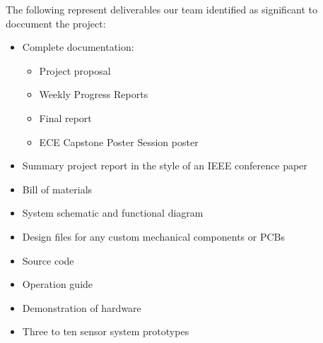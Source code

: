 The following represent deliverables our team identified as significant to doccument the project:
\begin{itemize}
\item Complete documentation:
\begin{itemize}
\item Project proposal
\item Weekly Progress Reports
\item Final report
\item ECE Capstone Poster Session poster
\end{itemize}
\item Summary project report in the style of an IEEE conference paper
\item Bill of materials
\item System schematic and functional diagram
\item Design files for any custom mechanical components or PCBs
\item Source code
\item Operation guide
\item Demonstration of hardware
\item Three to ten sensor system prototypes
\end{itemize}